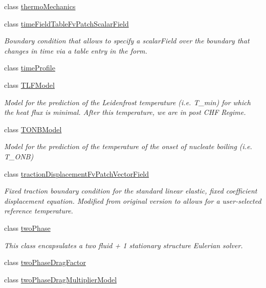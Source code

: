 \begin{DoxyCompactItemize}
class \hyperlink{classFoam_1_1thermoMechanics}{thermo\+Mechanics}
\item 
class \hyperlink{classFoam_1_1timeFieldTableFvPatchScalarField}{time\+Field\+Table\+Fv\+Patch\+Scalar\+Field}
\begin{DoxyCompactList}\small\item\em Boundary condition that allows to specify a scalar\+Field over the boundary that changes in time via a table entry in the form. \end{DoxyCompactList}\item 
class \hyperlink{classFoam_1_1timeProfile}{time\+Profile}
\item 
class \hyperlink{classFoam_1_1TLFModel}{T\+L\+F\+Model}
\begin{DoxyCompactList}\small\item\em Model for the prediction of the Leidenfrost temperature (i.\+e. T\+\_\+min) for which the heat flux is minimal. After this temperature, we are in post C\+HF Regime. \end{DoxyCompactList}\item 
class \hyperlink{classFoam_1_1TONBModel}{T\+O\+N\+B\+Model}
\begin{DoxyCompactList}\small\item\em Model for the prediction of the temperature of the onset of nucleate boiling (i.\+e. T\+\_\+\+O\+NB) \end{DoxyCompactList}\item 
class \hyperlink{classFoam_1_1tractionDisplacementFvPatchVectorField}{traction\+Displacement\+Fv\+Patch\+Vector\+Field}
\begin{DoxyCompactList}\small\item\em Fixed traction boundary condition for the standard linear elastic, fixed coefficient displacement equation. Modified from original version to allows for a user-\/selected reference temperature. \end{DoxyCompactList}\item 
class \hyperlink{classFoam_1_1twoPhase}{two\+Phase}
\begin{DoxyCompactList}\small\item\em This class encapsulates a two fluid + 1 stationary structure Eulerian solver. \end{DoxyCompactList}\item 
class \hyperlink{classFoam_1_1twoPhaseDragFactor}{two\+Phase\+Drag\+Factor}
\item 
class \hyperlink{classFoam_1_1twoPhaseDragMultiplierModel}{two\+Phase\+Drag\+Multiplier\+Model}

\end{DoxyCompactItemize}
